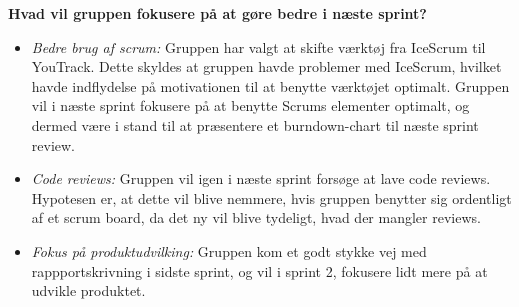 \textbf{Hvad vil gruppen fokusere på at gøre bedre i næste sprint?}
\begin{itemize}
    \item \textit{Bedre brug af scrum:} Gruppen har valgt at skifte værktøj fra IceScrum til YouTrack. Dette skyldes at gruppen havde problemer med IceScrum, hvilket
    havde indflydelse på motivationen til at benytte værktøjet optimalt. Gruppen vil i næste sprint fokusere på at benytte Scrums elementer optimalt, og dermed være i stand
    til at præsentere et burndown-chart til næste sprint review.
    \item \textit{Code reviews:} Gruppen vil igen i næste sprint forsøge at lave code reviews. Hypotesen er, at dette vil blive nemmere, hvis gruppen benytter sig ordentligt 
    af et scrum board, da det ny vil blive tydeligt, hvad der mangler reviews.
    \item \textit{Fokus på produktudvilking:} Gruppen kom et godt stykke vej med rappportskrivning i sidste sprint, og vil i sprint 2, fokusere lidt mere på at udvikle produktet.
\end{itemize}